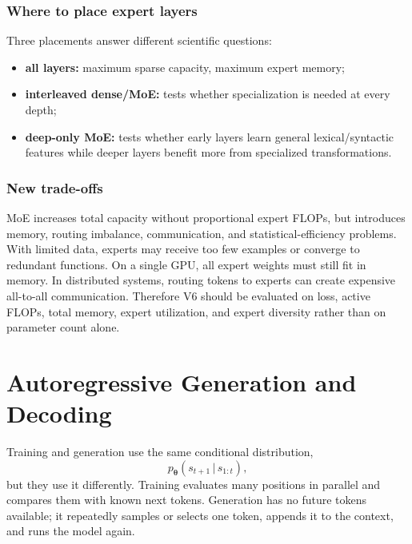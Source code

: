 \documentclass[11pt,a4paper]{article}
\theoremstyle{definition}
\theoremstyle{plain}
\newcommand{\vtheta}{\bm{\theta}}
\newcommand{\given}{\,|\,}
\begin{document}
\subsubsection{Where to place expert layers}

Three placements answer different scientific questions:
\begin{itemize}[nosep]
    \item \textbf{all layers:} maximum sparse capacity, maximum expert memory;
    \item \textbf{interleaved dense/MoE:} tests whether specialization is needed at every depth;
    \item \textbf{deep-only MoE:} tests whether early layers learn general lexical/syntactic features while deeper layers benefit more from specialized transformations.
\end{itemize}

\subsubsection{New trade-offs}

MoE increases total capacity without proportional expert FLOPs, but introduces memory, routing imbalance, communication, and statistical-efficiency problems. With limited data, experts may receive too few examples or converge to redundant functions. On a single GPU, all expert weights must still fit in memory. In distributed systems, routing tokens to experts can create expensive all-to-all communication. Therefore V6 should be evaluated on loss, active FLOPs, total memory, expert utilization, and expert diversity rather than on parameter count alone.

\section{Autoregressive Generation and Decoding}
\label{sec:generation}

Training and generation use the same conditional distribution,
\begin{equation}
    p_{\vtheta}(s_{t+1}\given s_{1:t}),
\end{equation}
but they use it differently. Training evaluates many positions in parallel and compares them with known next tokens. Generation has no future tokens available; it repeatedly samples or selects one token, appends it to the context, and runs the model again.
\end{document}
